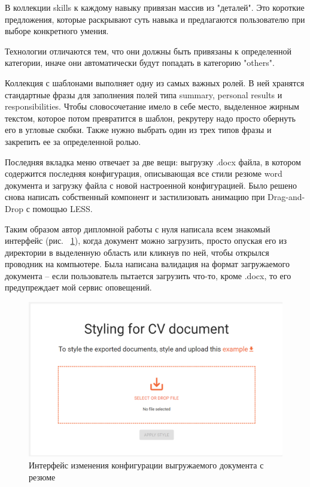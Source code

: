 \documentclass[12pt, a4paper]{diplom}
\begin{document}
В коллекции skills к каждому навыку привязан массив из "деталей". Это короткие предложения, которые раскрывают суть навыка и предлагаются пользователю при выборе конкретного умения.

Технологии отличаются тем, что они должны быть привязаны к определенной категории, иначе они автоматически будут попадать в категорию "others".

Коллекция с шаблонами выполняет одну из самых важных ролей. В ней хранятся стандартные фразы для заполнения полей типа summary, personal results и responsibilities. Чтобы словосочетание имело в себе место, выделенное жирным текстом, которое потом превратится в шаблон, рекрутеру надо просто обернуть его в угловые скобки.
Также нужно выбрать один из трех типов фразы и закрепить ее за определенной ролью.

Последняя вкладка меню отвечает за две вещи: выгрузку .docx файла, в котором содержится последняя конфигурация, описывающая все стили резюме word документа и загрузку файла с новой настроенной конфигурацией.
Было решено снова написать собственный компонент и застилизовать анимацию при Drag-and-Drop с помощью LESS.


Таким образом автор дипломной работы с нуля написала всем знакомый интерфейс (рис. ~\ref{20}), когда документ можно загрузить, просто опуская его из директории в выделенную область или кликнув по ней, чтобы открылся проводник на компьютере. Была написана валидация на формат загружаемого документа -- если пользователь пытается загрузить что-то, кроме .docx, то его предупреждает мой сервис оповещений.

\begin{figure}[!ht]
\centering
\includegraphics[width=1\textwidth]{resources/doc.png}
\caption{Интерфейс изменения конфигурации выгружаемого документа с резюме}
\label{20}
\end{figure}
\end{document}

